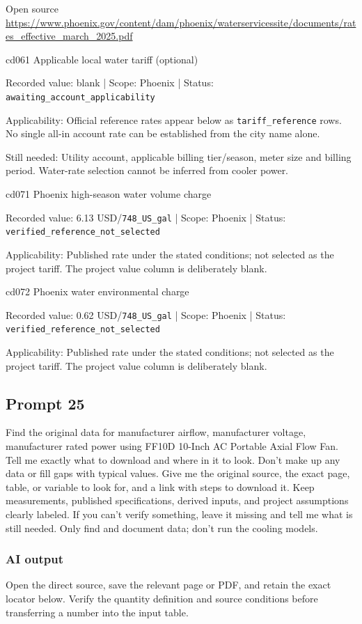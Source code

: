 Open source  \url{https://www.phoenix.gov/content/dam/phoenix/waterservicessite/documents/rates_effective_march_2025.pdf}

cd061  Applicable local water tariff (optional)

Recorded value: blank | Scope: Phoenix | Status: \nolinkurl{awaiting_account_applicability}

Applicability: Official reference rates appear below as \nolinkurl{tariff_reference} rows. No single all-in account rate can be established from the city name alone.

Still needed: Utility account, applicable billing tier/season, meter size and billing period. Water-rate selection cannot be inferred from cooler power.

cd071  Phoenix high-season water volume charge

Recorded value: 6.13 USD/\nolinkurl{748_US_gal} | Scope: Phoenix | Status: \nolinkurl{verified_reference_not_selected}

Applicability: Published rate under the stated conditions; not selected as the project tariff. The project value column is deliberately blank.

cd072  Phoenix water environmental charge

Recorded value: 0.62 USD/\nolinkurl{748_US_gal} | Scope: Phoenix | Status: \nolinkurl{verified_reference_not_selected}

Applicability: Published rate under the stated conditions; not selected as the project tariff. The project value column is deliberately blank.

\subsection*{Prompt 25}
Find the original data for manufacturer airflow, manufacturer voltage, manufacturer rated power using FF10D 10-Inch AC Portable Axial Flow Fan. Tell me exactly what to download and where in it to look. Don’t make up any data or fill gaps with typical values. Give me the original source, the exact page, table, or variable to look for, and a link with steps to download it. Keep measurements, published specifications, derived inputs, and project assumptions clearly labeled. If you can’t verify something, leave it missing and tell me what is still needed. Only find and document data; don’t run the cooling models.

\subsubsection*{AI output}
Open the direct source, save the relevant page or PDF, and retain the exact locator below. Verify the quantity definition and source conditions before transferring a number into the input table.

